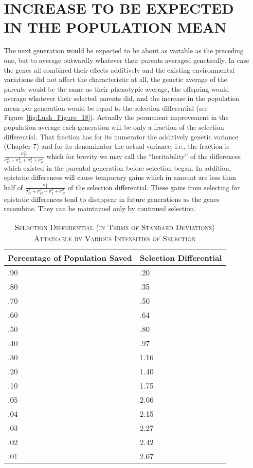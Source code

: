 \section*{INCREASE TO BE EXPECTED IN THE POPULATION MEAN}

The next generation would be expected to be about as variable as
the preceding one, but to average outwardly whatever their parents
averaged genetically. In case the genes all combined their effects additively
and the existing environmental variations did not affect the characteristic
at all, the genetic average of the parents would be the same as
their phenotypic average, the offspring would average whatever their
selected parents did, and the increase in the population mean per generation
would be equal to the selection differential (see Figure~\ref{fig:Lush_Figure_18}).
Actually the permanent improvement in the population average each
generation will be only a fraction of the selection differential.
 That fraction
has for its numerator the additively genetic variance (Chapter 7)
and for its denominator the actual variance; i.e., the fraction is
$\frac{\sigma_G^2}{\sigma_G^2 + \sigma_D^2 + \sigma_I^2 + \sigma_E^2}$ which for
brevity we may call the ``heritability'' of the differences which existed in the
parental generation before selection began. In addition, 
epistatic differences
will cause temporary gains which in amount are less than half of
$\frac{\sigma_I^2}{\sigma_G^2 + \sigma_D^2 + \sigma_I^2 + \sigma_E^2}$ of the
selection differential. These gains from selecting for epistatic differences
tend to disappear in future generations as the genes recombine. They
can be maintained only by continued selection.

\begin{table}
	\centering
	\caption{\textsc{Selection Differential (in Terms of Standard Deviations) Attainable by Various Intensities of Selection}}
	\label{tbl:Lush_Table_12}
	\begin{tabular}{C{5cm}|C{5cm}}
		\hline
		\hline
		Percentage of Population Saved	& Selection Differential 	\\
		\hline
		.90								& .20						\\
		.80								& .35						\\
		.70								& .50						\\
		.60								& .64						\\
		.50								& .80						\\
		.40								& .97						\\
		.30								& 1.16						\\
		.20								& 1.40						\\
		.10								& 1.75						\\
		.05								& 2.06						\\
		.04								& 2.15						\\
		.03								& 2.27						\\
		.02								& 2.42						\\
		.01								& 2.67						\\
		\hline
	\end{tabular}
\end{table}

